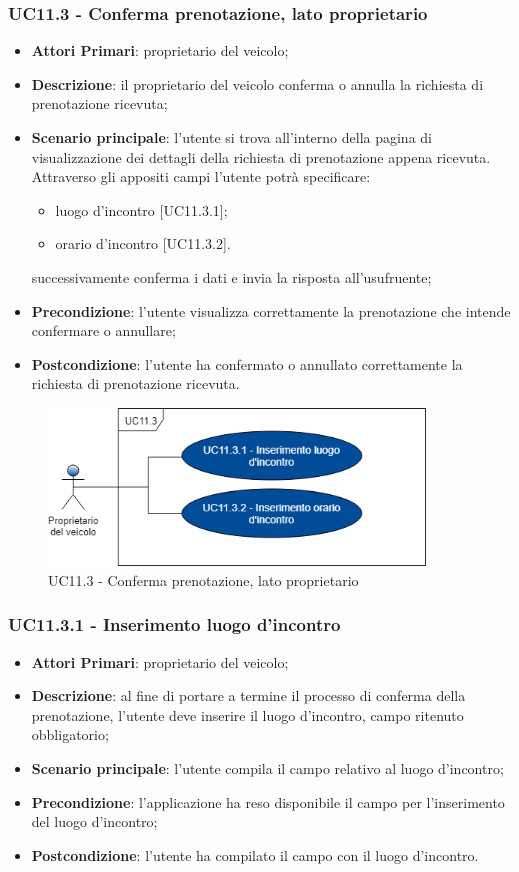 \subsubsection{UC11.3 - Conferma prenotazione, lato proprietario}
\begin{itemize}
	\item \textbf{Attori Primari}: proprietario del veicolo;
	\item \textbf{Descrizione}: il proprietario del veicolo conferma o annulla la richiesta di prenotazione ricevuta;
	\item \textbf{Scenario principale}: l'utente si trova all'interno della pagina di visualizzazione dei dettagli della richiesta di prenotazione appena ricevuta. Attraverso gli appositi campi l'utente potrà specificare:
	\begin{itemize}
		\item luogo d'incontro [UC11.3.1];
		\item orario d'incontro [UC11.3.2].
	\end{itemize} 
	successivamente conferma i dati e invia la risposta all'usufruente;
	\item \textbf{Precondizione}: l'utente visualizza correttamente la prenotazione che intende confermare o annullare;
	\item \textbf{Postcondizione}: l'utente ha confermato o annullato correttamente la richiesta di prenotazione ricevuta.
\end{itemize}
\begin{figure}[h]
	\includegraphics[width=10cm]{res/images/UC11-3Conferma.png}
	\centering
	\caption{UC11.3 - Conferma prenotazione, lato proprietario}
\end{figure}
\subsubsection{UC11.3.1 - Inserimento luogo d'incontro}
\begin{itemize}
	\item \textbf{Attori Primari}: proprietario del veicolo;
	\item \textbf{Descrizione}: al fine di portare a termine il processo di conferma della prenotazione, l'utente deve inserire il luogo d'incontro, campo ritenuto obbligatorio;
	\item \textbf{Scenario principale}: l'utente compila il campo relativo al luogo d'incontro;	
	\item \textbf{Precondizione}: l'applicazione ha reso disponibile il campo per l'inserimento del luogo d'incontro;
	\item \textbf{Postcondizione}: l'utente ha compilato il campo con il luogo d'incontro.	
\end{itemize}
